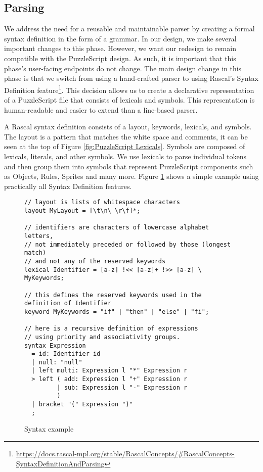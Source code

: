 \subsection{Parsing}
We address the need for a reusable and maintainable parser by creating a formal syntax definition in the form of a grammar. In our design, we make several important changes to this phase. However, we want our redesign to remain compatible with the PuzzleScript design. As such, it is important that this phase's user-facing endpoints do not change. The main design change in this phase is that we switch from using a hand-crafted parser to using Rascal's Syntax Definition feature\footnote{\url{https://docs.rascal-mpl.org/stable/RascalConcepts/\#RascalConcepts-SyntaxDefinitionAndParsing}}\dd. This decision allows us to create a declarative representation of a PuzzleScript file that consists of lexicals and symbols. This representation is human-readable and easier to extend than a line-based parser. 

A Rascal syntax definition consists of a layout, keywords, lexicals, and symbols. The layout is a pattern that matches the white space and comments, it can be seen at the top of Figure \ref{fig:PuzzleScript Lexicals}. Symbols are composed of lexicals, literals, and other symbols. We use lexicals to parse individual tokens and then group them into symbols that represent PuzzleScript components such as Objects, Rules, Sprites and many more. Figure \ref{fig:syntax_example} shows a simple example using practically all Syntax Definition features.

\begin{figure}[!t]
\begin{lstlisting}[language=rascal]    
// layout is lists of whitespace characters
layout MyLayout = [\t\n\ \r\f]*;

// identifiers are characters of lowercase alphabet letters, 
// not immediately preceded or followed by those (longest match)
// and not any of the reserved keywords
lexical Identifier = [a-z] !<< [a-z]+ !>> [a-z] \ MyKeywords;

// this defines the reserved keywords used in the definition of Identifier
keyword MyKeywords = "if" | "then" | "else" | "fi";

// here is a recursive definition of expressions 
// using priority and associativity groups.
syntax Expression 
  = id: Identifier id
  | null: "null"
  | left multi: Expression l "*" Expression r
  > left ( add: Expression l "+" Expression r
         | sub: Expression l "-" Expression r
         )
  | bracket "(" Expression ")"
  ;
\end{lstlisting}
\vspace*{-8pt}
\caption{Syntax example}
\label{fig:syntax_example}
\end{figure}

